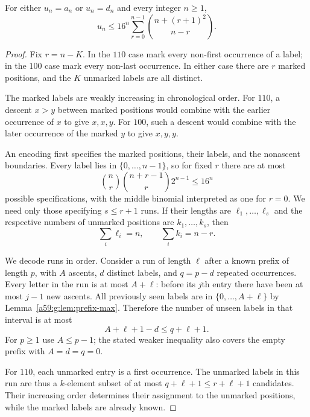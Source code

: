 \documentclass[11pt,letterpaper]{article}
\theoremstyle{remark}\newtheorem{remark}[theorem]{Remark}
\theoremstyle{remark}\newtheorem{wremark}{Remark}\renewcommand{\thewremark}{W\arabic{wremark}}
\theoremstyle{plain}\newtheorem{wcorollary}[wremark]{Corollary}
\begin{document}
\begin{proposition}\label{a59:g:prop:finite-upper}
For either $u_n=a_n$ or $u_n=d_n$ and every integer $n\geq1$,
\begin{equation}\label{a59:g:eq:finite-upper}
 u_n\leq16^n\sum_{r=0}^{n-1}
               \binom{n+(r+1)^2}{n-r}.
\end{equation}
\end{proposition}
\begin{proof}
Fix $r=n-K$. In the $110$ case mark every non-first occurrence of a label; in the $100$ case mark every non-last occurrence. In either case there are $r$ marked positions, and the $K$ unmarked labels are all distinct.

The marked labels are weakly increasing in chronological order. For $110$, a descent $x>y$ between marked positions would combine with the earlier occurrence of $x$ to give $x,x,y$. For $100$, such a descent would combine with the later occurrence of the marked $y$ to give $x,y,y$.

An encoding first specifies the marked positions, their labels, and the nonascent boundaries. Every label lies in $\{0,\ldots,n-1\}$, so for fixed $r$ there are at most
\begin{equation}\label{a59:g:eq:skeleton}
 \binom nr\binom{n+r-1}{r}2^{n-1}\leq16^n
\end{equation}
possible specifications, with the middle binomial interpreted as one for $r=0$. We need only those specifying $s\leq r+1$ runs. If their lengths are $\ell_1,\ldots,\ell_s$ and the respective numbers of unmarked positions are $k_1,\ldots,k_s$, then
\[
 \sum_i\ell_i=n,\qquad \sum_i k_i=n-r.
\]

We decode runs in order. Consider a run of length $\ell$ after a known prefix of length $p$, with $A$ ascents, $d$ distinct labels, and $q=p-d$ repeated occurrences. Every letter in the run is at most $A+\ell$: before its $j$th entry there have been at most $j-1$ new ascents. All previously seen labels are in $\{0,\ldots,A+\ell\}$ by Lemma~\ref{a59:g:lem:prefix-max}. Therefore the number of unseen labels in that interval is at most
\begin{equation}\label{a59:g:eq:unseen}
 A+\ell+1-d\leq q+\ell+1.
\end{equation}
For $p\geq1$ use $A\leq p-1$; the stated weaker inequality also covers the empty prefix with $A=d=q=0$.

For $110$, each unmarked entry is a first occurrence. The unmarked labels in this run are thus a $k$-element subset of at most $q+\ell+1\leq r+\ell+1$ candidates. Their increasing order determines their assignment to the unmarked positions, while the marked labels are already known.


\end{proof}
\end{document}

